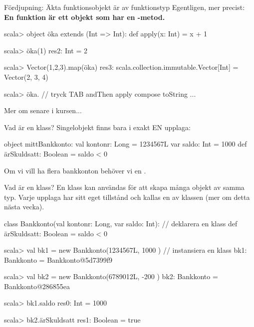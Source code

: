 \begin{Slide}{Fördjupning: Äkta funktionsobjekt är av funktionstyp}
Egentligen, mer precist:\\
\textbf{En funktion är ett objekt  som har en -metod.}
\pause
\begin{REPLnonum}
scala> object öka extends (Int => Int):
         def apply(x: Int) = x + 1
 
scala> öka(1)
res2: Int = 2

scala> Vector(1,2,3).map(öka)
res3: scala.collection.immutable.Vector[Int] = Vector(2, 3, 4)

scala> öka.   // tryck TAB
andThen   apply   compose   toString  ...
\end{REPLnonum}
Mer om  senare i kursen... %
\end{Slide}




\begin{Slide}{Vad är en klass?}
Singelobjekt finns bara i exakt EN upplaga:
\begin{Code}
object mittBankkonto:
  val kontonr: Long        = 1234567L
  var saldo: Int           = 1000
  def ärSkuldsatt: Boolean = saldo < 0
\end{Code}
Om vi vill ha flera bankkonton behöver vi en  .
\end{Slide}

\begin{Slide}{Vad är en klass?}
En klass kan användas för att skapa många objekt av samma typ. Varje upplaga har sitt eget tillstånd och kallas en  av klassen (mer om detta nästa vecka).
\begin{Code}
class Bankkonto(val kontonr: Long, var saldo: Int): // deklarera en klass
  def ärSkuldsatt: Boolean = saldo < 0
\end{Code}
\pause
\begin{REPL}
scala> val bk1 = new Bankkonto(1234567L, 1000 )   // instansiera en klass
bk1: Bankkonto = Bankkonto@5d7399f9

scala> val bk2 = new Bankkonto(6789012L, -200 )
bk2: Bankkonto = Bankkonto@286855ea

scala> bk1.saldo
res0: Int = 1000

scala> bk2.ärSkuldsatt
res1: Boolean = true
\end{REPL}
\end{Slide}

